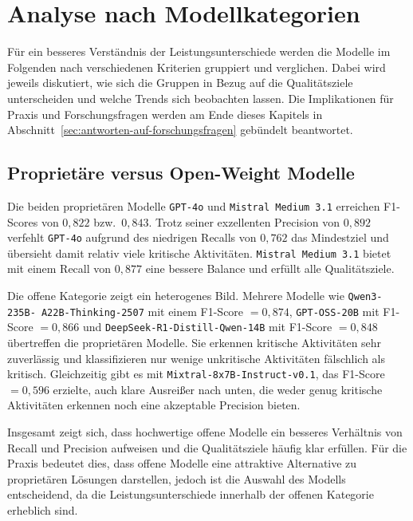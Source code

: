 \section{Analyse nach Modellkategorien}\label{sec:analyse-nach-modellkategorien}

Für ein besseres Verständnis der Leistungsunterschiede werden die Modelle im Folgenden nach verschiedenen Kriterien gruppiert und verglichen. Dabei wird jeweils diskutiert, wie sich die Gruppen in Bezug auf die Qualitätsziele unterscheiden und welche Trends sich beobachten lassen. Die Implikationen für Praxis und Forschungsfragen werden am Ende dieses Kapitels in Abschnitt~\ref{sec:antworten-auf-forschungsfragen} gebündelt beantwortet.

\subsection*{Proprietäre versus Open-Weight Modelle}

Die beiden proprietären Modelle \texttt{GPT-4o} und \texttt{Mistral Medium 3.1} erreichen F1-Scores von $0{,}822$ bzw.\ $0{,}843$. Trotz seiner exzellenten Precision von $0{,}892$ verfehlt \texttt{GPT-4o} aufgrund des niedrigen Recalls von $0{,}762$ das Mindestziel und übersieht damit relativ viele kritische Aktivitäten. \texttt{Mistral Medium 3.1} bietet mit einem Recall von $0{,}877$ eine bessere Balance und erfüllt alle Qualitätsziele.

Die offene Kategorie zeigt ein heterogenes Bild. Mehrere Modelle wie \texttt{Qwen3-235B-\linebreak~A22B-Thinking-2507} mit einem F1-Score $= 0{,}874$, \texttt{GPT-OSS-20B} mit F1-Score $= 0{,}866$ und \texttt{DeepSeek-R1-Distill-Qwen-14B} mit F1-Score $= 0{,}848$ übertreffen die proprietären Modelle. Sie erkennen kritische Aktivitäten sehr zuverlässig und klassifizieren nur wenige unkritische Aktivitäten fälschlich als kritisch. Gleichzeitig gibt es mit \texttt{Mixtral-8x7B-Instruct-v0.1}, das F1-Score $= 0{,}596$ erzielte, auch klare Ausreißer nach unten, die weder genug kritische Aktivitäten erkennen noch eine akzeptable Precision bieten.

Insgesamt zeigt sich, dass hochwertige offene Modelle ein besseres Verhältnis von Recall und Precision aufweisen und die Qualitätsziele häufig klar erfüllen. Für die Praxis bedeutet dies, dass offene Modelle eine attraktive Alternative zu proprietären Lösungen darstellen, jedoch ist die Auswahl des Modells entscheidend, da die Leistungsunterschiede innerhalb der offenen Kategorie erheblich sind.

